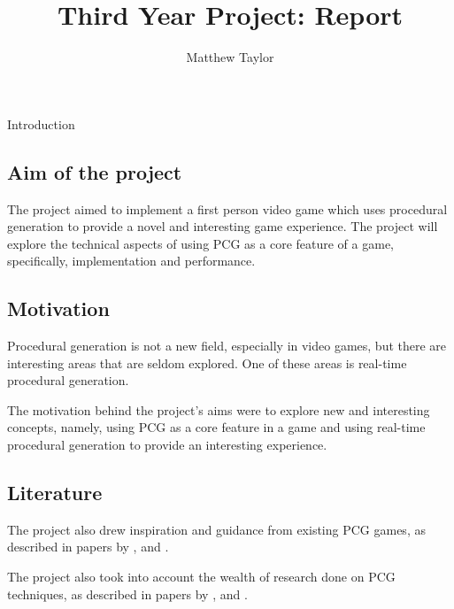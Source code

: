 \documentclass[final]{cmpreport}
\title{Third Year Project: Report}
\author{Matthew Taylor}
\begin{document}
\maketitle

\begin{section}{Introduction}

\subsection{Aim of the project}
The project aimed to implement a first person video game which uses procedural generation to provide a novel and interesting game experience. The project will explore the technical aspects of using PCG as a core feature of a game, specifically, implementation and performance. 

\subsection{Motivation}
Procedural generation is not a new field, especially in video games, but there are interesting areas that are seldom explored. One of these areas is real-time procedural generation.

The motivation behind the project's aims were to explore new and interesting concepts, namely, using PCG as a core feature in a game and using real-time procedural generation to provide an interesting experience.

\subsection{Literature}
The project also drew inspiration and guidance from existing PCG games, as described in papers by \citet{spufford_2003}, \cite{welsh_2016} and \cite{gct-spelunky}.

The project also took into account the wealth of research done on PCG techniques, as described in papers by \cite{Perlin:1985:IS:325165.325247}, \cite{ebert2003texturing} and \cite{Dormans:2010:ALD:1814256.1814257}.
   

\end{section}
\end{document}
